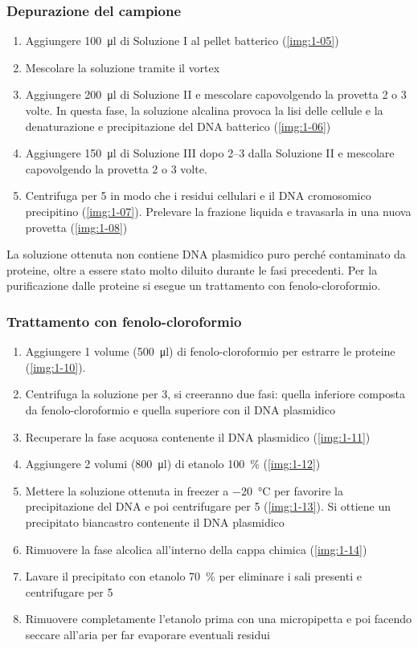 \subsubsection{Depurazione del campione}
\begin{enumerate}
	\item Aggiungere \qty{100}{\micro\litre} di Soluzione I al pellet batterico (\autoref{img:1-05})
	\item Mescolare la soluzione tramite il \foreignlanguage{english}{vortex}
	\item Aggiungere \qty{200}{\micro\litre} di Soluzione II e mescolare capovolgendo la provetta 2 o 3 volte. In questa fase, la soluzione alcalina provoca la lisi delle cellule e la denaturazione e precipitazione del DNA batterico (\autoref{img:1-06})
	\item Aggiungere \qty{150}{\micro\litre} di Soluzione III dopo \qtyrange{2}{3}{\min} dalla Soluzione II e mescolare capovolgendo la provetta 2 o 3 volte.
	\item Centrifuga per \qty{5}{\min} in modo che i residui cellulari e il DNA cromosomico precipitino (\autoref{img:1-07}). Prelevare la frazione liquida e travasarla in una nuova provetta (\autoref{img:1-08})
\end{enumerate}
La soluzione ottenuta non contiene DNA plasmidico puro perché contaminato da proteine, oltre a essere stato molto diluito durante le fasi precedenti. Per la purificazione dalle proteine si esegue un trattamento con fenolo-cloroformio.
\subsubsection{Trattamento con fenolo-cloroformio}
\begin{enumerate}
	\item Aggiungere 1 volume (\qty{500}{\micro\litre}) di fenolo-cloroformio per estrarre le proteine (\autoref{img:1-10}).
	\item  Centrifuga la soluzione per \qty{3}{\min}, si creeranno due fasi: quella inferiore composta da fenolo-cloroformio e quella superiore con il DNA plasmidico
	\item Recuperare la fase acquosa contenente il DNA plasmidico (\autoref{img:1-11})
	\item Aggiungere 2 volumi (\qty{800}{\micro\litre}) di etanolo \qty{100}{\percent} (\autoref{img:1-12})
	\item Mettere la soluzione ottenuta in freezer a \qty{-20}{\celsius} per favorire la precipitazione del DNA e poi centrifugare per \qty{5}{\min} (\autoref{img:1-13}). Si ottiene un precipitato biancastro contenente il DNA plasmidico
	\item Rimuovere la fase alcolica all’interno della cappa chimica (\autoref{img:1-14})
	\item Lavare il precipitato con etanolo \qty{70}{\percent} per eliminare i sali presenti e centrifugare per \qty{5}{\min}
	\item Rimuovere completamente l’etanolo prima con una micropipetta e poi facendo seccare all’aria per far evaporare eventuali residui
\end{enumerate}

